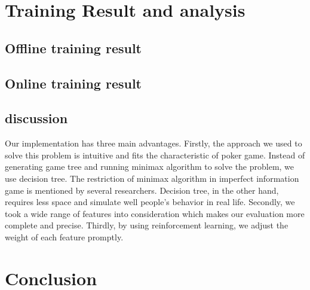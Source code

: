 \documentclass{article}
\begin{document}
\section{Training Result and analysis}
\subsection{Offline training result}
\subsection{Online training result}
\subsection{discussion}
Our implementation has three main advantages. Firstly, the approach we used to solve this problem is intuitive and fits the characteristic of poker game. Instead of generating game tree and running minimax algorithm to solve the problem, we use decision tree. The restriction of minimax algorithm in imperfect information game is mentioned by several researchers. Decision tree, in the other hand, requires less space and simulate well people's behavior in real life. Secondly, we took a wide range of features into consideration which makes our evaluation more complete and precise. Thirdly, by using reinforcement learning, we adjust the weight of each feature promptly.
\section{Conclusion}




\end{document}
